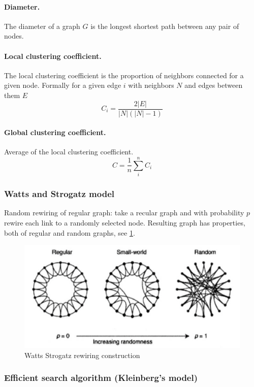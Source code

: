 \paragraph{Diameter.}
  The diameter of a graph $G$ is the longest shortest path between any pair of nodes.

\paragraph{Local clustering coefficient.}
  The local clustering coefficient is the proportion of neighbors connected for a given node. Formally for a given edge $i$ with neighbors $N$ and edges between them $E$
  \[
    C_i = \frac { 2|E|}{|N|(|N|-1)}
  \]

\paragraph{Global clustering coefficient.}
  Average of the local clustering coefficient.
  \[
    C = \frac 1 n \sum_i^n C_i
  \]

\subsubsection{Watts and Strogatz model}

Random rewiring of regular graph: take a recular graph and with probability $p$ rewire each link to a randomly selected node. Resulting graph has properties, both of regular and random graphs, see \cref{fig:watts_strogatz}.

\begin{figure}
  \centering
  \includegraphics[width=1\linewidth]{figures/watts_strogatz_graph.png}
  \caption{Watts Strogatz rewiring construction}
  \label{fig:watts_strogatz}
\end{figure}

\subsubsection{Efficient search algorithm (Kleinberg’s model)}

